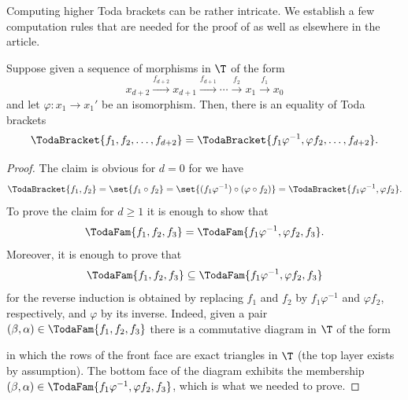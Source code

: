 \documentclass[a4paper]{amsart}
\begin{document}
Computing higher Toda brackets can be rather intricate. We establish a few
computation rules that are needed for the proof of
 as well as elsewhere in the article.

\begin{lemma}
  \label{lemma:TodaBracket_red-iso}
  Suppose given a sequence of morphisms in $\T$ of the form
  \[
    x_{d+2}\xrightarrow{f_{d+2}}x_{d+1}\xrightarrow{f_{d+1}}\cdots\xrightarrow{f_2}x_1\xrightarrow{f_1}x_0
  \]
  and let $\varphi\colon x_1\to x_1'$ be an isomorphism. Then, there is an
  equality of Toda brackets
  \[
    \TodaBracket{f_1,f_2,\dots,f_{d+2}}=\TodaBracket{f_1\varphi^{-1},\varphi
      f_2,\dots,f_{d+2}}.
  \]
\end{lemma}
\begin{proof}
  The claim is obvious for $d=0$ for we have
  \[
    \TodaBracket{f_1,f_2}=\set{f_1\circ
      f_2}=\set{(f_1\varphi^{-1})\circ(\varphi\circ
      f_2)}=\TodaBracket{f_1\varphi^{-1},\varphi f_2}.
  \]
  To prove the claim for $d\geq1$ it is enough to show that
  \[
    \TodaFam{f_1,f_2,f_3}=\TodaFam{f_1\varphi^{-1},\varphi f_2,f_3}.
  \]
  Moreover, it is enough to prove that
  \[
    \TodaFam{f_1,f_2,f_3}\subseteq\TodaFam{f_1\varphi^{-1},\varphi f_2,f_3}
  \]
  for the reverse induction is obtained by replacing $f_1$ and $f_2$ by
  $f_1\varphi^{-1}$ and $\varphi f_2$, respectively, and $\varphi$ by its
  inverse. Indeed, given a pair $(\beta,\alpha)\in\TodaFam{f_1,f_2,f_3}$ there
  is a commutative diagram in $\T$ of the form
  \begin{center}
  \end{center}
  in which the rows of the front face are exact triangles in $\T$ (the top layer
  exists by assumption). The bottom face of the diagram exhibits the membership
  $(\beta,\alpha)\in\TodaFam{f_1\varphi^{-1},\varphi f_2,f_3}$, which is what we
  needed to prove.
\end{proof}
\end{document}
